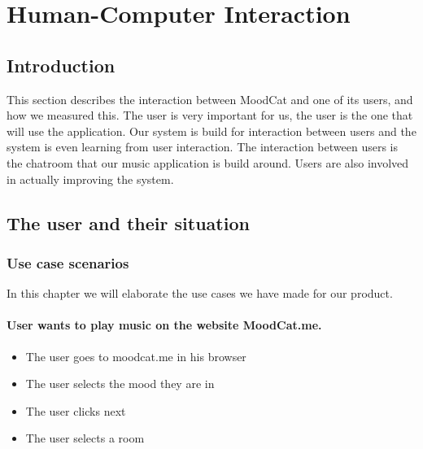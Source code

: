 \chapter{Human-Computer Interaction}

\section{Introduction}
This section describes the interaction between MoodCat and one of its users, and how we measured this.
The user is very important for us, the user is the one that will use the application.
Our system is build for interaction between users and the system is even learning from user interaction.
The interaction between users is the chatroom that our music application is build around.
Users are also involved in actually improving the system.



\section{The user and their situation}

\subsection{Use case scenarios}
In this chapter we will elaborate the use cases we have made for our product.

\subsubsection{User wants to play music on the website MoodCat.me.}
\begin{itemize}
\item The user goes to moodcat.me in his browser
\item The user selects the mood they are in
\item The user clicks next
\item The user selects a room
\end{itemize}

